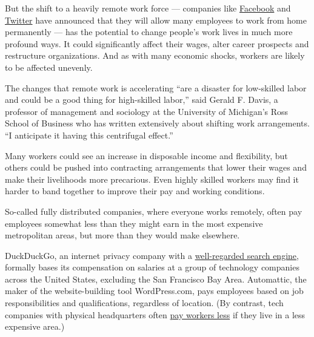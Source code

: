 But the shift to a heavily remote work force --- companies like
\href{https://www.nytimes3xbfgragh.onion/2020/05/21/technology/facebook-remote-work-coronavirus.html}{Facebook}
and
\href{https://blog.twitter.com/en_us/topics/company/2020/keeping-our-employees-and-partners-safe-during-coronavirus.html}{Twitter}
have announced that they will allow many employees to work from home
permanently --- has the potential to change people's work lives in much
more profound ways. It could significantly affect their wages, alter
career prospects and restructure organizations. And as with many
economic shocks, workers are likely to be affected unevenly.

The changes that remote work is accelerating ``are a disaster for
low-skilled labor and could be a good thing for high-skilled labor,''
said Gerald F. Davis, a professor of management and sociology at the
University of Michigan's Ross School of Business who has written
extensively about shifting work arrangements. ``I anticipate it having
this centrifugal effect.''

Many workers could see an increase in disposable income and flexibility,
but others could be pushed into contracting arrangements that lower
their wages and make their livelihoods more precarious. Even highly
skilled workers may find it harder to band together to improve their pay
and working conditions.

So-called fully distributed companies, where everyone works remotely,
often pay employees somewhat less than they might earn in the most
expensive metropolitan areas, but more than they would make elsewhere.

DuckDuckGo, an internet privacy company with a
\href{https://techcrunch.com/2019/03/13/google-has-quietly-added-duckduckgo-as-a-search-engine-option-for-chrome-users-in-60-markets/?guccounter=1\&guce_referrer=aHR0cHM6Ly93d3cuZ29vZ2xlLmNvbS8\&guce_referrer_sig=AQAAAAj0VxWoB4Iq0f2i-xW6kWicdUxvc0XsbHvypmrqhDVT-voogAV3mv85fW4mnj2EBkU7vPAeP3RJZdpwafyO-zfGC40rZPv-EbVTEs-_cTj26GL3FwVYIeQzGm7Z1KMpmWws8CyLIok7mNs9ZPOQ_kcnBQyBPedngwl_BQTSJo07}{well-regarded
search engine}, formally bases its compensation on salaries at a group
of technology companies across the United States, excluding the San
Francisco Bay Area. Automattic, the maker of the website-building tool
WordPress.com, pays employees based on job responsibilities and
qualifications, regardless of location. (By contrast, tech companies
with physical headquarters often
\href{https://www.cnbc.com/2020/05/21/zuckerberg-50percent-of-facebook-employees-could-be-working-remotely.html}{pay
workers less} if they live in a less expensive area.)

